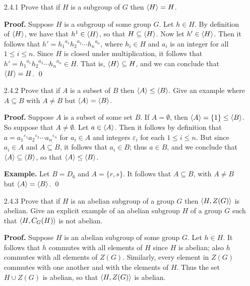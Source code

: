 \begin{enumerate}
   \item[2.4.1]   Prove that if $H$ is a subgroup of $G$ then $\langle H \rangle = H$.

      \textbf{Proof.} Suppose $H$ is a subgroup of some group $G$. Let
      $h \in H$. By definition of $\langle H \rangle$, we have that $h^1 \in \langle H \rangle$, so
      that $H \subseteq \langle H \rangle$. Now let $h' \in \langle H \rangle$. Then it follows that
      $h' = {h_1}^{a_1}{h_2}^{a_2}\cdots {h_n}^{a_n}$, where $h_i \in H$ and
      $a_i$ is an integer for all $1 \le i \le n$. Since $H$ is closed under
      multiplication, it follows that
      $h' = {h_1}^{a_1}{h_2}^{a_2}\cdots {h_n}^{a_n} \in H$. That is, 
      $\langle H \rangle \subseteq H$, and we can conclude that $\langle H \rangle = H$. \qed
   \item[2.4.2]   Prove that if $A$ is a subset of $B$ then
                  $\langle A \rangle \le \langle B \rangle$. Give an example where $A \subseteq B$
                  with $A \neq B$ but $\langle A \rangle = \langle B \rangle$.

      \textbf{Proof.} Suppose $A$ is a subset of some set $B$. If
      $A = \emptyset$, then $\langle A \rangle = \{1\} \le \langle B \rangle$. So suppose that
      $A \neq \emptyset$. Let $a \in \langle A \rangle$. Then it follows by definition
      that $a = {a_1}^{\varepsilon_1}{a_2}^{\varepsilon_2}\cdots
      {a_n}^{\varepsilon_n}$ for $a_i \in A$ and integers $\varepsilon_i$ for
      each $1 \le i \le n$. But since $a_i \in A$ and $A \subseteq B$, it
      follows that $a_i \in B$; thus $a \in B$, and we conclude that
      $\langle A \rangle \subseteq \langle B \rangle$, so that $\langle A \rangle \le \langle B \rangle$.

      \textbf{Example.} Let $B = D_6$ and $A = \{r, s\}$. It follows that
      $A \subseteq B$, with $A \neq B$ but $\langle A \rangle = \langle B \rangle$. \qed
   \item[2.4.3]   Prove that if $H$ is an abelian subgroup of a group $G$ then
                  $\langle H, Z(G) \rangle$ is abelian. Give an explicit example of an
                  abelian subgroup $H$ of a group $G$ such that
                  $\langle H, C_G(H) \rangle$ is not abelian.

      \textbf{Proof.} Suppose $H$ is an abelian subgroup of some group $G$. Let
      $h \in H$. It follows that $h$ commutes with all elements of $H$ since
      $H$ is abelian; also $h$ commutes with all elements of $Z(G)$. Similarly,
      every element in $Z(G)$ commutes with one another and with the elements of
      $H$. Thus the set $H \cup Z(G)$ is abelian, so that $\langle H, Z(G) \rangle$ is
      abelian.


\end{enumerate}
